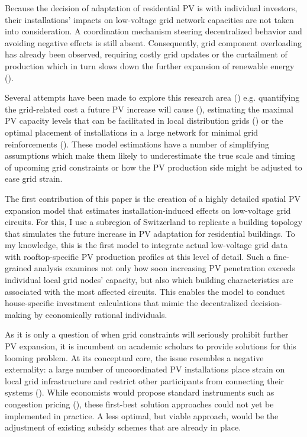\documentclass[12PT, ]{article}
\begin{document}
Because the decision of adaptation of residential PV is with individual investors, their installations' impacts on low-voltage grid network capacities are not taken into consideration. A coordination mechanism steering decentralized behavior and avoiding negative effects is still absent. 
Consequently, grid component overloading has already been observed, requiring costly grid updates or the curtailment of production which in turn slows down the further expansion of renewable energy (\cite{renewables2023}). 

Several attempts have been made to explore this research area (\cite{tomar2024}) e.g. quantifying the grid-related cost a future PV increase will cause (\cite{bfe_ep2050_netz2022}), estimating the maximal PV capacity levels that can be facilitated in local distribution grids (\cite{tevar2019}) or the optimal placement of installations in a large network for minimal grid reinforcements (\cite{gupta2021}).
These model estimations have a number of simplifying assumptions which make them likely to underestimate the true scale and timing of upcoming grid constraints or how the PV production side might be adjusted to ease grid strain.

The first contribution of this paper is the creation of a highly detailed spatial PV expansion model that estimates installation-induced effects on low-voltage grid circuits. 
For this, I use a subregion of Switzerland to replicate a building topology that simulates the future increase in PV adaptation for residential buildings. To my knowledge, this is the first model to integrate actual low-voltage grid data with rooftop-specific PV production profiles at this level of detail.
Such a fine-grained analysis examines not only how soon increasing PV penetration exceeds individual local grid nodes' capacity, but also which building characteristics are associated with the most affected circuits. 
This enables the model to conduct house-specific investment calculations that mimic the decentralized decision-making by economically rational individuals. 


As it is only a question of when grid constraints will seriously prohibit further PV expansion, it is incumbent on academic scholars to provide solutions for this looming problem. 
At its conceptual core, the issue resembles a negative externality: a large number of uncoordinated PV installations place strain on local grid infrastructure and restrict other participants from connecting their systems (\cite{babar2019, tomar2024}). 
While economists would propose standard instruments such as congestion pricing (\cite{bai2018}), these first-best solution approaches could not yet be implemented in practice. 
A less optimal, but viable approach, would be the adjustment of existing subsidy schemes that are already in place. 
\end{document}
